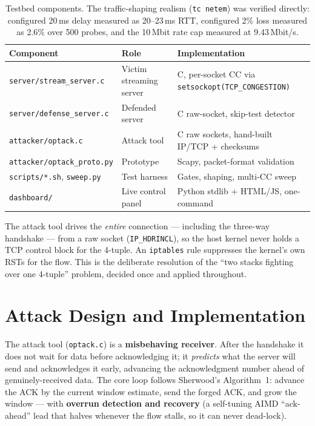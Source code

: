 \documentclass[11pt,a4paper]{article}
\begin{document}
\begin{table}[h]
\centering\small
\begin{tabular}{@{}p{4.2cm} p{3.3cm} p{6.4cm}@{}}
\toprule
\textbf{Component} & \textbf{Role} & \textbf{Implementation} \\
\midrule
\texttt{server/stream\_server.c} & Victim streaming server & C, per-socket CC via \texttt{setsockopt(TCP\_CONGESTION)} \\
\texttt{server/defense\_server.c} & Defended server & C raw-socket, skip-test detector \\
\texttt{attacker/optack.c} & Attack tool & C raw sockets, hand-built IP/TCP + checksums \\
\texttt{attacker/optack\_proto.py} & Prototype & Scapy, packet-format validation \\
\texttt{scripts/*.sh}, \texttt{sweep.py} & Test harness & Gates, shaping, multi-CC sweep \\
\texttt{dashboard/} & Live control panel & Python stdlib + HTML/JS, one-command \\
\bottomrule
\end{tabular}
\caption{Testbed components. The traffic-shaping realism (\texttt{tc netem}) was verified
directly: configured 20\,ms delay measured as 20--23\,ms RTT, configured 2\% loss measured
as 2.6\% over 500 probes, and the 10\,Mbit rate cap measured at 9.43\,Mbit/s.}
\end{table}

\begin{notebox}
The attack tool drives the \emph{entire} connection --- including the three-way
handshake --- from a raw socket (\texttt{IP\_HDRINCL}), so the host kernel never holds a
TCP control block for the 4-tuple. An \texttt{iptables} rule suppresses the kernel's own
RSTs for the flow. This is the deliberate resolution of the ``two stacks fighting over one
4-tuple'' problem, decided once and applied throughout.
\end{notebox}

\section{Attack Design and Implementation}
\label{sec:design}

The attack tool (\texttt{optack.c}) is a \textbf{misbehaving receiver}. After the
handshake it does not wait for data before acknowledging it; it \emph{predicts} what the
server will send and acknowledges it early, advancing the acknowledgment number ahead of
genuinely-received data. The core loop follows Sherwood's Algorithm~1: advance the ACK by
the current window estimate, send the forged ACK, and grow the window --- with
\textbf{overrun detection and recovery} (a self-tuning AIMD ``ack-ahead'' lead that halves
whenever the flow stalls, so it can never dead-lock).
\end{document}
